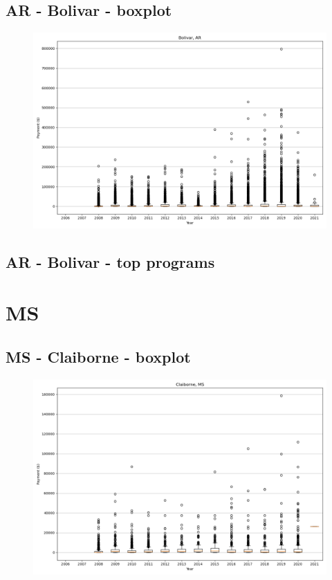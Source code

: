 \subsection*{AR - Bolivar - boxplot}
\begin{figure}[h]
\centering
\includegraphics[width=7in]{../output/boxplots/counties/Bolivar-AR_boxplot.png}
\end{figure}


\subsection*{AR - Bolivar - top programs}

\newpage
\section*{MS}
\subsection*{MS - Claiborne - boxplot}
\begin{figure}[h]
\centering
\includegraphics[width=7in]{../output/boxplots/counties/Claiborne-MS_boxplot.png}
\end{figure}


